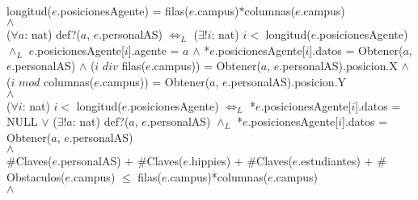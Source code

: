 {	\\
	longitud($e$.posicionesAgente) = filas($e$.campus)$*$columnas($e$.campus)
	\\
	$\land$
	\\
	($\forall a$: nat) def?($a$, $e$.personalAS) $\Leftrightarrow_L$ ($\exists! i$: nat) $i <$ longitud($e$.posicionesAgente) $\land_L$ $e$.posicionesAgente[$i$].agente = $a$ $\land$ *$e$.posicionesAgente[$i$].datos = Obtener($a$, $e$.personalAS) $\land$ ($i$ $div$ filas($e$.campus)) = Obtener($a$, $e$.personalAS).posicion.X $\land$ ($i$ $mod$ columnas($e$.campus)) = Obtener($a$, $e$.personalAS).posicion.Y
	\\
	$\land$
	\\
	($\forall i$: nat) $i <$ longitud($e$.posicionesAgente) $\Leftrightarrow_L$ *$e$.posicionesAgente[$i$].datos = NULL $\lor$ ($\exists! a$: nat) def?($a$, $e$.personalAS) $\land_L$ *$e$.posicionesAgente[$i$].datos = Obtener($a$, $e$.personalAS)
	\\
	$\land$
	\\
	$\#$Claves($e$.personalAS) $+$ $\#$Claves($e$.hippies) $+$ $\#$Claves($e$.estudiantes) $+$ $\#$Obstaculos($e$.campus) $\leq$ filas($e$.campus)*columnas($e$.campus)
	\\
	$\land$
	\\

	

}\mbox{}


